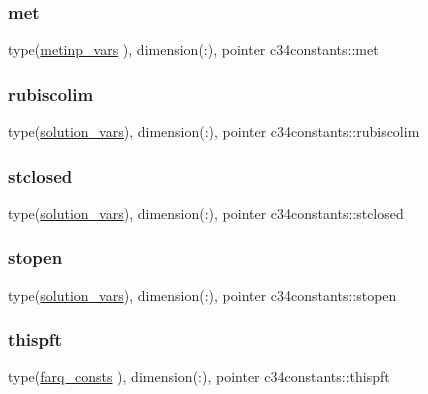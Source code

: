 \mbox{\label{namespacec34constants_a6d1c98b7c360f24d485be8fc38bdd284}} 
\subsubsection{\texorpdfstring{met}{met}}
{\footnotesize\ttfamily type(\hyperlink{structc34constants_1_1metinp__vars}{metinp\+\_\+vars} ), dimension(\+:), pointer c34constants\+::met}

\mbox{\label{namespacec34constants_a54cb2e4894b639d22e50b457b4208cfc}} 
\subsubsection{\texorpdfstring{rubiscolim}{rubiscolim}}
{\footnotesize\ttfamily type(\hyperlink{structc34constants_1_1solution__vars}{solution\+\_\+vars}), dimension(\+:), pointer c34constants\+::rubiscolim}

\mbox{\label{namespacec34constants_a083891d928147a7252ada72b49b240a3}} 
\subsubsection{\texorpdfstring{stclosed}{stclosed}}
{\footnotesize\ttfamily type(\hyperlink{structc34constants_1_1solution__vars}{solution\+\_\+vars}), dimension(\+:), pointer c34constants\+::stclosed}

\mbox{\label{namespacec34constants_a5affd928720d3a40f01f1198b68b7fb3}} 
\subsubsection{\texorpdfstring{stopen}{stopen}}
{\footnotesize\ttfamily type(\hyperlink{structc34constants_1_1solution__vars}{solution\+\_\+vars}), dimension(\+:), pointer c34constants\+::stopen}

\mbox{\label{namespacec34constants_a4a1314df0becf145f8a2365aa27d992d}} 
\subsubsection{\texorpdfstring{thispft}{thispft}}
{\footnotesize\ttfamily type(\hyperlink{structc34constants_1_1farq__consts}{farq\+\_\+consts} ), dimension(\+:), pointer c34constants\+::thispft}

